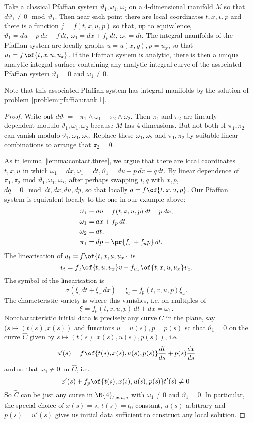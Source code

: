 \begin{theorem}\label{theorem:4.d}
Take a classical Pfaffian system \(\vartheta_1,\omega_1,\omega_2\) on a 4-dimensional manifold \(M\) so that \(d\vartheta_1 \ne 0 \mod{\vartheta_1}\).
Then near each point there are local coordinates \(t,x,u,p\) and there is a function \(f=f(t,x,u,p)\) so that, up to equivalence, \(\vartheta_1=du-p \, dx - f \, dt\), \(\omega_1=dx+f_p \, dt\), \(\omega_2=dt\).
The integral manifolds of the Pfaffian system are locally graphs \(u=u(x,y), p=u_x\), so that \(u_t=f\of{t,x,u,u_x}\).
If the Pfaffian system is analytic, there is then a unique analytic integral surface containing any analytic integral curve of the associated Pfaffian system \(\vartheta_1=0\) and \(\omega_1 \ne 0\).
\end{theorem}
Note that this associated Pfaffian system has integral manifolds by the solution of problem~\vref{problem:pfaffian:rank.1}.
\begin{proof}
Write out \(d\vartheta_1=-\pi_1 \wedge \omega_1 - \pi_2 \wedge \omega_2\). 
Then \(\pi_1\) and \(\pi_2\) are linearly dependent modulo \(\vartheta_1, \omega_1, \omega_2\) because \(M\) has 4 dimensions.
But not both of \(\pi_1, \pi_2\) can vanish modulo \(\vartheta_1,\omega_1,\omega_2\).
Replace these \(\omega_1, \omega_2\) and \(\pi_1, \pi_2\) by suitable linear combinations to arrange that \(\pi_2=0\).

As in lemma~\vref{lemma:contact.three}, we argue that there are local coordinates \(t,x,u\) in which \(\omega_1=dx, \omega_1=dt, \vartheta_1=du-p \, dx - q \, dt\).
By linear dependence of \(\pi_1, \pi_2\) mod \(\vartheta_1,\omega_1,\omega_2\), after perhaps swapping \(t,q\) with \(x,p\), \(dq=0 \mod{dt,dx,du,dp}\), so that locally \(q=f\of{t,x,u,p}\).
Our Pfaffian system is equivalent locally to the one in our example above:
\begin{align*}
\vartheta_1&=du-f(t,x,u,p) \, dt - p \, dx, \\
\omega_1&= dx+f_p \, dt, \\
\omega_2&= dt, \\
\pi_1&=dp-\pr{f_x + f_u p} \, dt.
\end{align*}
The linearisation of \(u_t=f\of{t,x,u,u_x}\) is
\[
v_t = f_u\of{t,u,u_x}v + f_{u_x}\of{t,x,u,u_x}v_x.
\]
The symbol of the linearisation is
\[
\sigma(\xi_t \, dt + \xi_x \, dx)= \xi_t - f_p(t,x,u,p)\xi_x.
\]
The characteristic variety is where this vanishes, i.e. on multiples of 
\[
\xi = f_p(t,x,u,p) \, dt + dx = \omega_1.
\]
Noncharacteristic initial data is precisely any curve \(C\) in the plane, say \((s \mapsto (t(s),x(s))\) and functions \(u=u(s), p=p(s)\) so that \(\vartheta_1=0\) on the curve \(\hat{C}\) given by \(s \mapsto (t(s),x(s),u(s),p(s))\), i.e. 
\[
u'(s)=f\of{t(s),x(s),u(s),p(s)}\frac{dt}{ds} + p(s)\frac{dx}{ds}
\]
and so that \(\omega_1\ne 0\) on \(\hat{C}\), i.e.
\[
x'(s) + f_p\of{t(s),x(s),u(s),p(s)} t'(s) \ne 0.
\]
So \(\hat{C}\) can be just any curve in \(\R{4}_{t,x,u,p}\) with \(\omega_1 \ne 0\) and \(\vartheta_1=0\).
In particular, the special choice of \(x(s)=s\), \(t(s)=t_0\) constant, \(u(s)\) arbitrary and \(p(s)=u'(s)\) gives us initial data sufficient to construct any local solution.
\end{proof}




